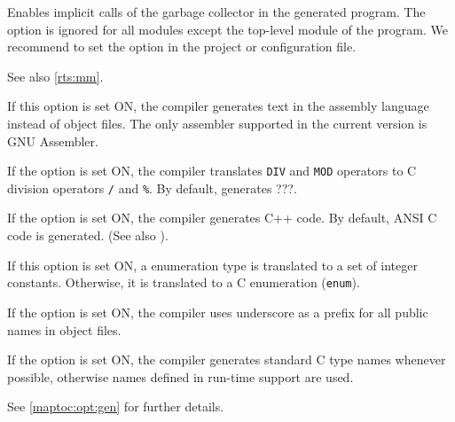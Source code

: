 \begin{description}
        Enables implicit  calls  of the garbage collector in the
        generated  program.  The option is ignored for all modules
        except the top-level module of the program.  We recommend   to
        set the option in the  project  or configuration file.

        See also \ref{rts:mm}.

\ifgencode
{}
        \MLBegin{}\ModeC{}\MLEnd{} \header

        If this option is set ON, the compiler generates text in the 
        assembly language instead of object files. The only assembler
        supported in the current version is GNU Assembler.
\fi
\ifgenc
{}
        \MLBegin{}\ModeC{}\MLEnd{} \header

        If the option is set ON, the compiler translates \verb'DIV' and
        \verb'MOD' operators to C division operators \verb'/' and \verb'%'.
        By default, \xds{} generates ???.

        \MLBegin{}\ModeC{}\MLEnd{} \header

        If the option is set ON, the compiler generates C++ code.
        By default, ANSI C code is generated.
        (See also ).

        \MLBegin{}\ModeC{}\MLEnd{} \header

        If this option is set ON, a \mt{} enumeration type is translated
        to a set of integer constants. Otherwise, it is translated to
        a C enumeration (\verb'enum').
\fi

\ifgencode
{}
        \MLBegin{}\ModeC{}\MLEnd{} \header

        If the option is set ON, the compiler uses underscore as
        a prefix for all public names in object files.

\fi

\ifgenc
{}
        \MLBegin{}\ModeC{}\MLEnd{} \header

        If the option is set ON, the compiler generates standard C type
        names whenever possible, otherwise names defined in
        run-time support are used.

        See \ref{maptoc:opt:gen} for further details.
\fi

\ifgenc
{}
        \MLBegin{}\ModeC{}\MLEnd{}


\end{description}
